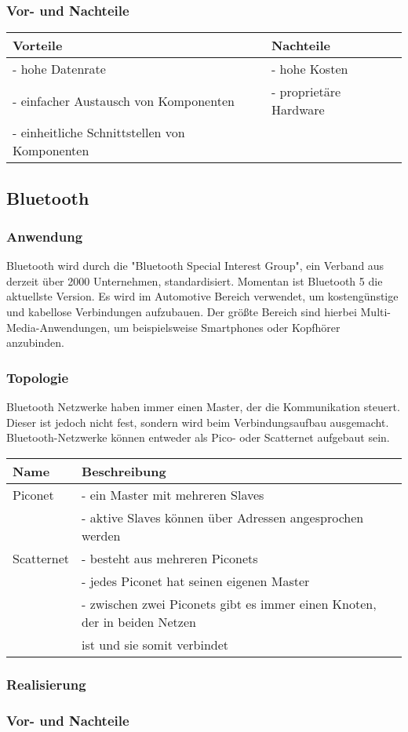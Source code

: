 \subsubsection{Vor- und Nachteile}
\begin{tabular}{l |l}
Vorteile & Nachteile\\
\hline - hohe Datenrate & - hohe Kosten\\
\hline - einfacher Austausch von Komponenten & - proprietäre Hardware\\
\hline - einheitliche Schnittstellen von Komponenten &\\
\end{tabular}

\subsection{Bluetooth}		
\subsubsection{Anwendung}
Bluetooth wird durch die "Bluetooth Special Interest Group", ein Verband aus derzeit über 2000 Unternehmen,  standardisiert. Momentan ist Bluetooth 5 die aktuellste Version. Es wird im Automotive Bereich verwendet, um kostengünstige und kabellose Verbindungen aufzubauen. Der größte Bereich sind hierbei Multi-Media-Anwendungen, um beispielsweise Smartphones oder Kopfhörer anzubinden.
\subsubsection{Topologie}
Bluetooth Netzwerke haben immer einen Master, der die Kommunikation steuert. Dieser ist jedoch nicht fest, sondern wird beim Verbindungsaufbau ausgemacht.
Bluetooth-Netzwerke können entweder als Pico- oder Scatternet aufgebaut sein.
\\
\begin{tabular}{l|l}
	Name & Beschreibung\\
	\hline Piconet & - ein Master mit mehreren Slaves\\
	& - aktive Slaves können über Adressen angesprochen werden\\
	\hline Scatternet & - besteht aus mehreren Piconets\\
	& - jedes Piconet hat seinen eigenen Master\\
	& - zwischen zwei Piconets gibt es immer einen Knoten, der in beiden Netzen \\
	& ist und sie somit verbindet
\end{tabular}

\subsubsection{Realisierung}
\subsubsection{Vor- und Nachteile}